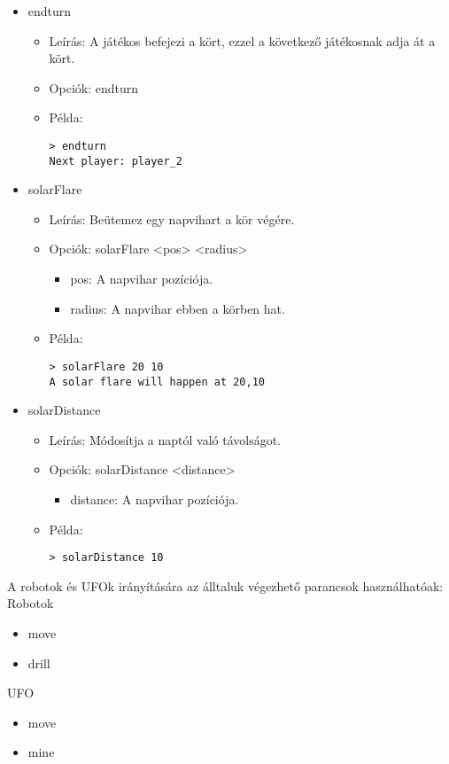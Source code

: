 \documentclass[../../projlab]{subfiles}
\begin{document}
\begin{itemize}
    \item endturn
    \begin{itemize}
        \item Leírás: A játékos befejezi a kört, ezzel a következő játékosnak adja át a kört.
        \item Opciók: endturn
        \item Példa:
            \begin{verbatim}
> endturn
Next player: player_2 
            \end{verbatim}
    \end{itemize}

    \item solarFlare
    \begin{itemize}
        \item Leírás: Beütemez egy napvihart a kör végére.
        \item Opciók: solarFlare <pos> <radius>
            \begin{itemize}
                \item pos: A napvihar pozíciója.
                \item radius: A napvihar ebben a körben hat.
            \end{itemize}
        \item Példa:
            \begin{verbatim}
> solarFlare 20 10
A solar flare will happen at 20,10
            \end{verbatim}
    \end{itemize}

    \item solarDistance
    \begin{itemize}
        \item Leírás: Módosítja a naptól való távolságot.
        \item Opciók: solarDistance <distance>
            \begin{itemize}
                \item distance: A napvihar pozíciója.
            \end{itemize}
        \item Példa:
            \begin{verbatim}
> solarDistance 10
            \end{verbatim}
    \end{itemize}

\end{itemize}

A robotok és UFOk irányítására az álltaluk végezhető parancsok használhatóak: \newline
Robotok
\begin{itemize}
    \item move
    \item drill
\end{itemize}
UFO
\begin{itemize}
    \item move
    \item mine
\end{itemize}
\end{document}
